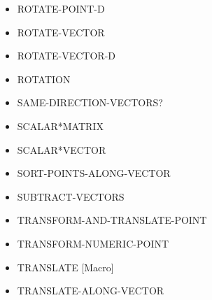 \documentclass [11pt]{book}
\begin{document}
\begin{itemize}
\item {}ROTATE-POINT-D





\item {}ROTATE-VECTOR





\item {}ROTATE-VECTOR-D





\item {}ROTATION





\item {}SAME-DIRECTION-VECTORS?





\item {}SCALAR*MATRIX





\item {}SCALAR*VECTOR





\item {}SORT-POINTS-ALONG-VECTOR





\item {}SUBTRACT-VECTORS





\item {}TRANSFORM-AND-TRANSLATE-POINT





\item {}TRANSFORM-NUMERIC-POINT





\item {}TRANSLATE [Macro]





\item {}TRANSLATE-ALONG-VECTOR






\end{itemize}
\end{document}
